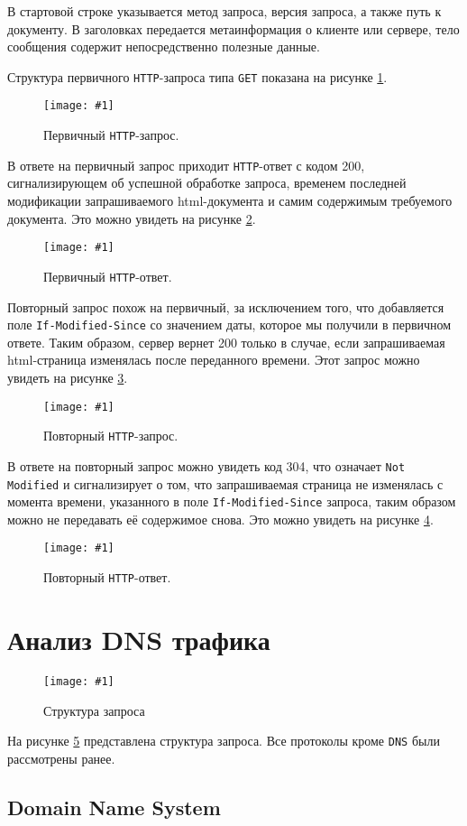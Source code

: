 \documentclass[12pt, a4paper]{article}
\newcommand{\figc}[4]{
  \begin{figure}[H]
  \begin{center}
    \texttt{[image: \#1]}
    \caption{#2}
    \label{fig:#3}
  \end{center}
  \end{figure}
}
\begin{document}
В стартовой строке указывается метод запроса, версия запроса, а также путь к
документу. В заголовках передается метаинформация о клиенте или сервере, тело
сообщения содержит непосредственно полезные данные.

Структура первичного \texttt{HTTP}-запроса типа \texttt{GET} показана на рисунке
\ref{fig:h_f_g}.

\figc{http_first_get}{Первичный \texttt{HTTP}-запрос.}{h_f_g}{2.5}

В ответе на первичный запрос приходит \texttt{HTTP}-ответ с кодом 200,
сигнализирующем об успешной обработке запроса, временем последней модификации
запрашиваемого html-документа и самим содержимым требуемого документа. Это
можно увидеть на рисунке \ref{fig:h_f_r}.

\figc{http_first_res}{Первичный \texttt{HTTP}-ответ.}{h_f_r}{2.5}

\newpage

Повторный запрос похож на первичный, за исключением того, что добавляется поле
\texttt{If-Modified-Since} со значением даты, которое мы получили в первичном
ответе. Таким образом, сервер вернет 200 только в случае, если запрашиваемая
html-страница изменялась после переданного времени. Этот запрос можно увидеть
на рисунке \ref{fig:h_s_g}.

\figc{http_second_get}{Повторный \texttt{HTTP}-запрос.}{h_s_g}{2.5}

В ответе на повторный запрос можно увидеть код 304, что означает \texttt{Not Modified}
и сигнализирует о том, что запрашиваемая страница не изменялась с момента времени,
указанного в поле \texttt{If-Modified-Since} запроса, таким образом можно не
передавать её содержимое снова. Это можно увидеть на рисунке \ref{fig:h_s_r}.

\figc{http_second_res}{Повторный \texttt{HTTP}-ответ.}{h_s_r}{2.5}

\newpage

\section{Анализ DNS трафика}

\figc{dns_headers}{Структура запроса}{d_h}{2.5}

На рисунке \ref{fig:d_h} представлена структура запроса. Все протоколы кроме
\texttt{DNS} были рассмотрены ранее.

\subsection{Domain Name System}
\end{document}
